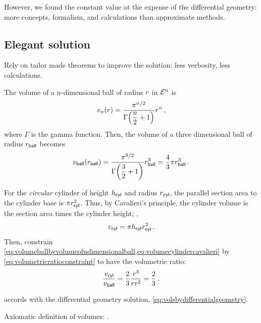  However, we found the constant value at the expense of the differential geometry: more concepts, formalism, and calculations than approximate methods.



\subsection{Elegant solution} %
\label{sub:elegant_solution}

 Rely on tailor made theorems to improve the solution: less verbosity, less calculations.

 The volume of a $n$-dimensional ball of radius $r$ in $\mathcal{E}^{n}$ is
%
\begin{equation*}
  \volume_{n}\vat{\radius} = \dfrac{\pi^{n/2}}{\Gamma\vat{\dfrac n2 + 1}}\radius^n\,,
\end{equation*}
%
where $\Gamma$ is the gamma function. Then, the volume of a three dimensional ball of radius $r_{\text{\textsf{ball}}}$ becomes
%
\begin{equation}\label{eq:volumeballbyvolumeofndimensionalball}
  \vball\vat\rball = \dfrac{\pi^{3/2}}{\Gamma\vat{\dfrac 32 + 1}}\rball^3
                   = \dfrac 43\pi\rball^3\,.
\end{equation}

 For the \emph{circular} cylinder of height $h_{\text{\textsf{cyl}}}$ and radius $r_{\text{\textsf{cyl}}}$, the parallel section area to the cylinder base is $\pi r_{\text{\textsf{cyl}}}^2$. Thus, by Cavalieri's principle, the cylinder volume is the section area times the cylinder height; \ie,
%
\begin{equation}\label{eq:volumecylindercavalieri}
  v_{\text{\textsf{cyl}}} = \pi h_{\text{\textsf{cyl}}}r_{\text{\textsf{cyl}}}^2\,.
\end{equation}
%
Then, constrain \cref{eq:volumeballbyvolumeofndimensionalball,eq:volumecylindercavalieri} by \cref{eq:volumetricratioconstraint} to have the volumetric ratio:
%
\begin{equation}\label{eq:elegantsolution}
  \dfrac{v_{\text{\textsf{cyl}}}}{v_{\text{\textsf{ball}}}} = \dfrac 23\dfrac{r^3}{rr^2}
                    = \dfrac 23\,.
\end{equation}

  accords with the differential geometry solution, \cref{eq:volsbydifferentialgeometry}.




Axiomatic definition of volumes: \cite[p. 112]{apostol:1967}.



